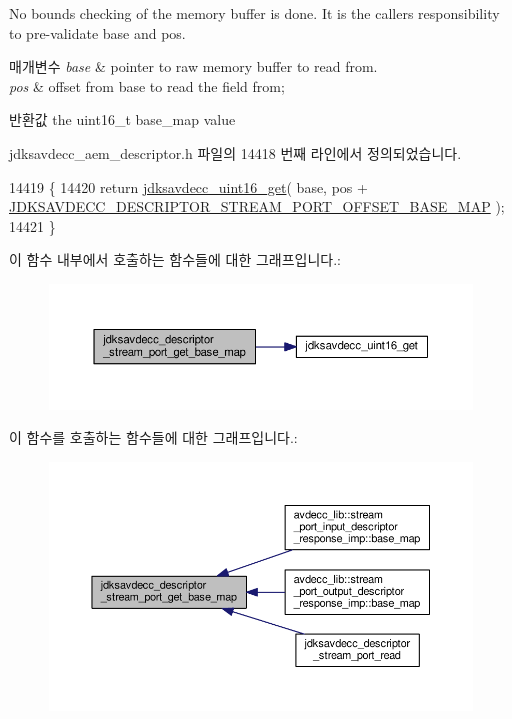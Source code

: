 No bounds checking of the memory buffer is done. It is the caller\textquotesingle{}s responsibility to pre-\/validate base and pos.


\begin{DoxyParams}{매개변수}
{\em base} & pointer to raw memory buffer to read from. \\
\hline
{\em pos} & offset from base to read the field from; \\
\hline
\end{DoxyParams}
\begin{DoxyReturn}{반환값}
the uint16\+\_\+t base\+\_\+map value 
\end{DoxyReturn}


jdksavdecc\+\_\+aem\+\_\+descriptor.\+h 파일의 14418 번째 라인에서 정의되었습니다.


\begin{DoxyCode}
14419 \{
14420     \textcolor{keywordflow}{return} \hyperlink{group__endian_ga3fbbbc20be954aa61e039872965b0dc9}{jdksavdecc\_uint16\_get}( base, pos + 
      \hyperlink{group__descriptor__stream__port_ga797ae923dddcf38e07bf98db516fb082}{JDKSAVDECC\_DESCRIPTOR\_STREAM\_PORT\_OFFSET\_BASE\_MAP} );
14421 \}
\end{DoxyCode}


이 함수 내부에서 호출하는 함수들에 대한 그래프입니다.\+:
\nopagebreak
\begin{figure}[H]
\begin{center}
\leavevmode
\includegraphics[width=350pt]{group__descriptor__stream__port_gacd1e6804280845a853725f6e38639380_cgraph}
\end{center}
\end{figure}




이 함수를 호출하는 함수들에 대한 그래프입니다.\+:
\nopagebreak
\begin{figure}[H]
\begin{center}
\leavevmode
\includegraphics[width=350pt]{group__descriptor__stream__port_gacd1e6804280845a853725f6e38639380_icgraph}
\end{center}
\end{figure}



